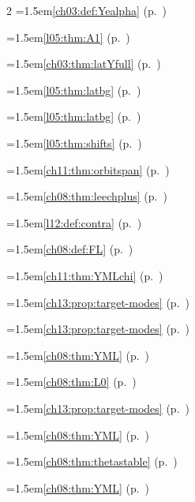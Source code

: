 \begin{multicols}{2}
\hangindent=1.5em\quad \ref{ch03:def:Yealpha} (p.~\pageref{ch03:def:Yealpha})\par
\hangindent=1.5em\quad \ref{l05:thm:A1} (p.~\pageref{l05:thm:A1})\par
\hangindent=1.5em\quad \ref{ch03:thm:latYfull} (p.~\pageref{ch03:thm:latYfull})\par
\hangindent=1.5em\quad \ref{l05:thm:latbg} (p.~\pageref{l05:thm:latbg})\par
\hangindent=1.5em\quad \ref{l05:thm:latbg} (p.~\pageref{l05:thm:latbg})\par
\hangindent=1.5em\quad \ref{l05:thm:shifts} (p.~\pageref{l05:thm:shifts})\par
\hangindent=1.5em\quad \ref{ch11:thm:orbitspan} (p.~\pageref{ch11:thm:orbitspan})\par
\hangindent=1.5em\quad \ref{ch08:thm:leechplus} (p.~\pageref{ch08:thm:leechplus})\par
\hangindent=1.5em\quad \ref{l12:def:contra} (p.~\pageref{l12:def:contra})\par
\hangindent=1.5em\quad \ref{ch08:def:FL} (p.~\pageref{ch08:def:FL})\par
\hangindent=1.5em\quad \ref{ch11:thm:YMLchi} (p.~\pageref{ch11:thm:YMLchi})\par
\hangindent=1.5em\quad \ref{ch13:prop:target-modes} (p.~\pageref{ch13:prop:target-modes})\par
\hangindent=1.5em\quad \ref{ch13:prop:target-modes} (p.~\pageref{ch13:prop:target-modes})\par
\hangindent=1.5em\quad \ref{ch08:thm:YML} (p.~\pageref{ch08:thm:YML})\par
\hangindent=1.5em\quad \ref{ch08:thm:L0} (p.~\pageref{ch08:thm:L0})\par
\hangindent=1.5em\quad \ref{ch13:prop:target-modes} (p.~\pageref{ch13:prop:target-modes})\par
\hangindent=1.5em\quad \ref{ch08:thm:YML} (p.~\pageref{ch08:thm:YML})\par
\hangindent=1.5em\quad \ref{ch08:thm:thetastable} (p.~\pageref{ch08:thm:thetastable})\par
\hangindent=1.5em\quad \ref{ch08:thm:YML} (p.~\pageref{ch08:thm:YML})\par

\end{multicols}
